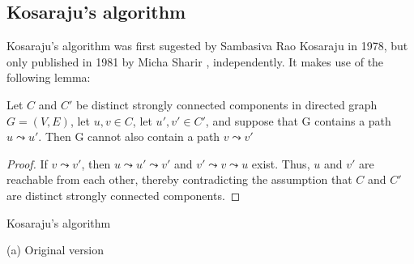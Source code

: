 \subsection{Kosaraju's algorithm} \label{algorithm-scc-kosaraju}
Kosaraju's algorithm was first sugested by Sambasiva Rao Kosaraju in 1978, but only published in 1981 by Micha Sharir \cite{sharir81}, independently. It makes use of the following lemma:
\begin{lemma} \label{lem:kosaraju1}
    Let $C$ and $C'$ be distinct strongly connected components in directed graph $G=(V,E)$, let $u,v \in C$, let $u',v' \in C'$, and suppose that G contains a path $u \leadsto u'$. Then G cannot also contain a path $v \leadsto v'$
\end{lemma}
\begin{proof}
    If $v \leadsto v'$, then $u \leadsto u' \leadsto v'$ and $v' \leadsto v \leadsto u$ exist. Thus, $u$ and $v'$ are reachable from each other, thereby contradicting the assumption that $C$ and $C'$ are distinct strongly connected components.
\end{proof}
\begin{center}
    \begin{algorithm}
        \caption{Kosaraju's algorithm}
        \label{alg-kosaraju}
        \begin{minipage}[t]{0.49\linewidth}
            (a) Original version
            \begin{algorithmic}[1]
                \EndFunction
            \end{algorithmic}
        \end{minipage}
    \end{algorithm}
\end{center}
